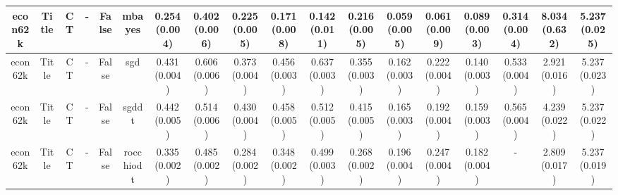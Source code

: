 \documentclass{article}
\begin{document}
{\begin{landscape}
\begin{table}[!h]
{\begin{tabular}{@{}cccccccccccccccccc@{}}
\midrule econ62k & Title & CT & - & False & mbayes & 0.254 (0.004) & 0.402 (0.006) & 0.225 (0.005) & 0.171 (0.008) & 0.142 (0.011) & 0.216 (0.005) & 0.059 (0.005) & 0.061 (0.009) & 0.089 (0.003) &0.314 (0.004) & 8.034 (0.632) & 5.237 (0.025)\\
\midrule econ62k & Title & CT & - & False & sgd & 0.431 (0.004) & 0.606 (0.006) & 0.373 (0.004) & 0.456 (0.003) & 0.637 (0.003) & 0.355 (0.003) & 0.162 (0.003) & 0.222 (0.004) & 0.140 (0.003) &0.533 (0.004) & 2.921 (0.016) & 5.237 (0.023)\\
\midrule econ62k & Title & CT & - & False & sgddt & 0.442 (0.005) & 0.514 (0.006) & 0.430 (0.004) & 0.458 (0.005) & 0.512 (0.005) & 0.415 (0.005) & 0.165 (0.003) & 0.192 (0.004) & 0.159 (0.003) &0.565 (0.004) & 4.239 (0.022) & 5.237 (0.022)\\
\midrule econ62k & Title & CT & - & False & rocchiodt & 0.335 (0.002) & 0.485 (0.002) & 0.284 (0.002) & 0.348 (0.002) & 0.499 (0.003) & 0.268 (0.002) & 0.196 (0.004) & 0.247 (0.004) & 0.182 (0.004) &- & 2.809 (0.017) & 5.237 (0.019)\\

                          \end{tabular}}
                          \end{table}


\end{landscape}}
\end{document}
